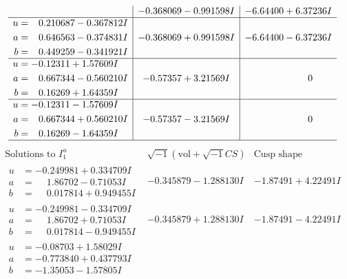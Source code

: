 \documentclass[1p]{elsarticle_modified}
\theoremstyle{definition}
\newcommand{\I}{\sqrt{-1}}
\begin{document}
$$\begin{array}{c|c|c}
 & -0.368069 - 0.991598 I & -6.64400 + 6.37236 I \\ \hline\begin{aligned}
u &= \phantom{-}0.210687 - 0.367812 I \\
a &= \phantom{-}0.646563 - 0.374831 I \\
b &= \phantom{-}0.449259 - 0.341921 I\end{aligned}
 & -0.368069 + 0.991598 I & -6.64400 - 6.37236 I \\ \hline\begin{aligned}
u &= -0.12311 + 1.57609 I \\
a &= \phantom{-}0.667344 - 0.560210 I \\
b &= \phantom{-}0.16269 + 1.64359 I\end{aligned}
 & -0.57357 + 3.21569 I & \phantom{-0.000000 } 0 \\ \hline\begin{aligned}
u &= -0.12311 - 1.57609 I \\
a &= \phantom{-}0.667344 + 0.560210 I \\
b &= \phantom{-}0.16269 - 1.64359 I\end{aligned}
 & -0.57357 - 3.21569 I & \phantom{-0.000000 } 0\\
 \hline 
 \end{array}$$\newpage$$\begin{array}{c|c|c}  
\text{Solutions to }I^u_{1}& \I (\text{vol} + \sqrt{-1}CS) & \text{Cusp shape}\\
 \hline 
\begin{aligned}
u &= -0.249981 + 0.334709 I \\
a &= \phantom{-}1.86702 - 0.71053 I \\
b &= \phantom{-}0.017814 + 0.949455 I\end{aligned}
 & -0.345879 - 1.288130 I & -1.87491 + 4.22491 I \\ \hline\begin{aligned}
u &= -0.249981 - 0.334709 I \\
a &= \phantom{-}1.86702 + 0.71053 I \\
b &= \phantom{-}0.017814 - 0.949455 I\end{aligned}
 & -0.345879 + 1.288130 I & -1.87491 - 4.22491 I \\ \hline\begin{aligned}
u &= -0.08703 + 1.58029 I \\
a &= -0.773840 + 0.437793 I \\
b &= -1.35053 - 1.57805 I\end{aligned}

\end{array}$$
\end{document}
